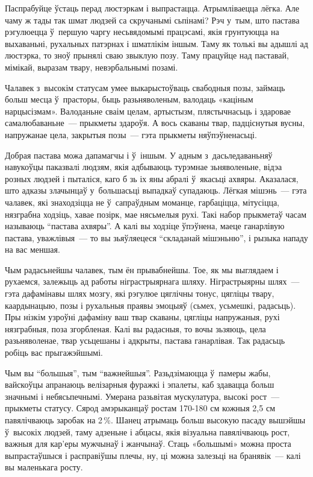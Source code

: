 Паспрабуйце ўстаць перад люстэркам і выпрастацца. Атрымліваецца лёгка. Але чаму ж тады так шмат людзей са скручанымі сьпінамі? Рэч у~тым, што пастава рэгулюецца ў~першую чаргу несьвядомымі працэсамі, якія грунтуюцца на выхаваньні, рухальных патэрнах і шматлікім іншым. Таму як толькі вы адышлі ад люстэрка, то зноў прынялі сваю звыклую позу. Таму працуйце над паставай, мімікай, выразам твару, невэрбальнымі позамі.

Чалавек з~высокім статусам умее выкарыстоўваць свабодныя позы, займаць больш месца ў~прасторы, быць разьняволеным, валодаць «каціным нарцысізмам». Валоданьне сваім целам, артыстызм, плястычнасьць і здаровае самалюбаваньне~--- прыкметы здароўя. А вось скаваны твар, падціснутыя вусны, напружанае цела, закрытыя позы~--- гэта прыкметы няўпэўненасьці.

Добрая пастава можа дапамагчы і ў~іншым. У адным з~дасьледаваньняў навукоўцы паказвалі людзям, якія адбываюць турэмнае зьняволеньне, відэа розных людзей і пыталіся, каго б зь іх яны абралі ў~якасьці ахвяры. Аказалася, што адказы злачынцаў у~большасьці выпадкаў супадаюць. Лёгкая мішэнь~--- гэта чалавек, які знаходзіцца не ў~сапраўдным моманце, гарбаціцца, мітусіцца, нязграбна ходзіць, хавае позірк, мае нясьмелыя рухі. Такі набор прыкметаў часам называюць ``пастава ахвяры''. А калі вы ходзіце ўпэўнена, маеце ганарлівую пастава, уважлівыя~--- то вы зьяўляецеся ``складанай мішэньню'', і рызыка нападу на вас меншая.

Чым радасьнейшы чалавек, тым ён прывабнейшы. Тое, як мы выглядаем і рухаемся, залежыць ад работы ніграстрыярнага шляху. Ніграстрыярны шлях~--- гэта дафамінавы шлях мозгу, які рэгулюе цяглічны тонус, цягліцы твару, каардынацыю, позы і рухальныя праявы эмоцыяў (сьмех, усьмешкі, радасьць). Пры нізкім узроўні дафаміну ваш твар скаваны, цягліцы напружаныя, рухі нязграбныя, поза згорбленая. Калі вы радасныя, то вочы зьзяюць, цела разьняволенае, твар усьцешаны і адкрыты, пастава ганарлівая. Так радасьць робіць вас прыгажэйшымі.

Чым вы ``большыя'', тым ``важнейшыя''. Разьдзімаюцца ў~памеры жабы, вайскоўцы апранаюць велізарныя фуражкі і эпалеты, каб здавацца больш значнымі і небясьпечнымі. Умерана разьвітая мускулатура, высокі рост~--- прыкметы статусу. Сярод амэрыканцаў ростам 170-180 см кожныя 2,5 см павялічваюць заробак на 2\,\%. Шанец атрымаць больш высокую пасаду вышэйшы ў~высокіх людзей, таму адзеньне і абцасы, якія візуальна павялічваюць рост, важныя для кар'еры мужчынаў і жанчынаў. Стаць «большымі» можна проста выпрастаўшыся і расправіўшы плечы, ну, ці можна залезьці на бранявік~--- калі вы маленькага росту. 

